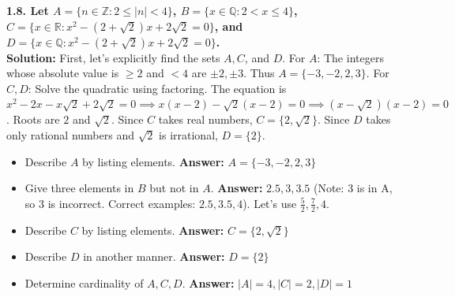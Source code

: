 \documentclass[12pt]{article}
\begin{document}
\vspace{0.5cm}
\textbf{1.8. Let $A = \{n \in \mathbb{Z} : 2 \le |n| < 4\}$, $B = \{x \in \mathbb{Q} : 2 < x \le 4\}$, \\ 
$C = \{x \in \mathbb{R} : x^2 - (2 + \sqrt{2})x + 2\sqrt{2} = 0\}$, and $D = \{x \in \mathbb{Q} : x^2 - (2 + \sqrt{2})x + 2\sqrt{2} = 0\}$.} \\
\textbf{Solution:}
First, let's explicitly find the sets $A, C$, and $D$.
For $A$: The integers whose absolute value is $\ge 2$ and $< 4$ are $\pm 2, \pm 3$. Thus $A = \{-3, -2, 2, 3\}$.
For $C, D$: Solve the quadratic using factoring. The equation is $x^2 - 2x - x\sqrt{2} + 2\sqrt{2} = 0 \implies x(x - 2) - \sqrt{2}(x - 2) = 0 \implies (x - \sqrt{2})(x - 2) = 0$. Roots are $2$ and $\sqrt{2}$. Since $C$ takes real numbers, $C = \{2, \sqrt{2}\}$. Since $D$ takes only rational numbers and $\sqrt{2}$ is irrational, $D = \{2\}$.
\begin{itemize}
    \item[(a)] Describe $A$ by listing elements. \textbf{Answer:} $A = \{-3, -2, 2, 3\}$
    \item[(b)] Give three elements in $B$ but not in $A$. \textbf{Answer:} $2.5, 3, 3.5$ (Note: 3 is in A, so $3$ is incorrect. Correct examples: $2.5, 3.5, 4$). Let's use $\frac{5}{2}, \frac{7}{2}, 4$.
    \item[(c)] Describe $C$ by listing elements. \textbf{Answer:} $C = \{2, \sqrt{2}\}$
    \item[(d)] Describe $D$ in another manner. \textbf{Answer:} $D = \{2\}$
    \item[(e)] Determine cardinality of $A, C, D$. \textbf{Answer:} $|A| = 4, |C| = 2, |D| = 1$
\end{itemize}
\end{document}
